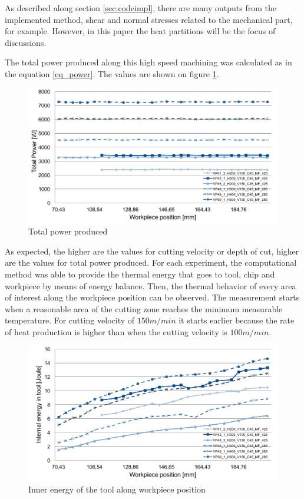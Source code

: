		As described along section \ref{sec:codeimpl}, there are many outputs from the implemented method, shear and normal stresses related to the mechanical part, for example. However, in this paper the heat partitions will be the focus of discussions.

		The total power produced along this high speed machining was calculated as in the equation \ref{eq_power}. The values are shown on figure \ref{fig:totPower}.

		\begin{figure}[H]
			\centering
			\captionsetup{justification=centering}
			\includegraphics[scale=0.55]{Imagens/Total_power.png}
			\caption{Total power produced}
			\label{fig:totPower}
		\end{figure}

		As expected, the higher are the values for cutting velocity or depth of cut, higher are the values for total power produced.
		For each experiment, the computational method was able to provide the thermal energy that goes to tool, chip and workpiece by means of energy balance. Then, the thermal behavior of every area of interest along the workpiece position can be observed. The measurement starts when a reasonable area of the cutting zone reaches the minimum measurable temperature. For cutting velocity of $150 m/min$ it starts earlier because the rate of heat production is higher than when the cutting velocity is $100 m/min$.

		\begin{figure}[H]
			\centering
			\captionsetup{justification=centering}
			\includegraphics[scale=0.55]{Imagens/Inner_Energy.png}
			\caption{Inner energy of the tool along workpiece position}
			\label{fig:innerTool}
		\end{figure}

